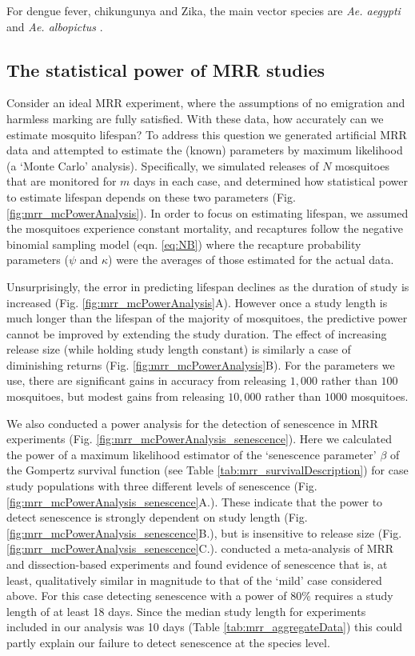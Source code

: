 \documentclass[12pt]{article}
\begin{document}
{For dengue fever, chikungunya and Zika, the main vector species are \textit{Ae. aegypti} and \textit{Ae. albopictus} \citep{kraemer2015global,grard2014zika,benelli2016declining}. 

\subsection{The statistical power of MRR studies}\label{sec:mrr_discussion_MonteCarlo}
Consider an ideal MRR experiment, where the assumptions of no emigration and harmless marking are fully satisfied. With these data, how accurately can we estimate mosquito lifespan? To address this question we generated artificial MRR data and attempted to estimate the (known) parameters by maximum likelihood (a `Monte Carlo' analysis). Specifically, we simulated releases of $N$ mosquitoes that are monitored for $m$ days in each case, and determined how statistical power to estimate lifespan depends on these two parameters (Fig. \ref{fig:mrr_mcPowerAnalysis}). In order to focus on estimating lifespan, we assumed the mosquitoes experience constant mortality, and recaptures follow the negative binomial sampling model (eqn. \ref{eq:NB}) where the recapture probability parameters ($\psi$ and $\kappa$) were the averages of those estimated for the actual data.

Unsurprisingly, the error in predicting lifespan declines as the duration of study is increased (Fig. \ref{fig:mrr_mcPowerAnalysis}A). However once a study length is much longer than the lifespan of the majority of mosquitoes, the predictive power cannot be improved by extending the study duration. The effect of increasing release size (while holding study length constant) is similarly a case of diminishing returns (Fig. \ref{fig:mrr_mcPowerAnalysis}B). For the parameters we use, there are significant gains in accuracy from releasing $1,000$ rather than $100$ mosquitoes, but modest gains from releasing $10,000$ rather than $1000$ mosquitoes.

We also conducted a power analysis for the detection of senescence in MRR experiments (Fig. \ref{fig:mrr_mcPowerAnalysis_senescence}). Here we calculated the power of a maximum likelihood estimator of the `senescence parameter' $\beta$ of the Gompertz survival function (see Table \ref{tab:mrr_survivalDescription}) for case study populations with three different levels of senescence (Fig. \ref{fig:mrr_mcPowerAnalysis_senescence}A.). These indicate that the power to detect senescence is strongly dependent on study length (Fig. \ref{fig:mrr_mcPowerAnalysis_senescence}B.), but is insensitive to release size (Fig. \ref{fig:mrr_mcPowerAnalysis_senescence}C.). \cite{clements1981analysis} conducted a meta-analysis of MRR and dissection-based experiments and found evidence of senescence that is, at least, qualitatively similar in magnitude to that of the `mild' case considered above. For this case detecting senescence with a power of 80\% requires a study length of at least 18 days. Since the median study length for experiments included in our analysis was 10 days (Table \ref{tab:mrr_aggregateData}) this could partly explain our failure to detect senescence at the species level.




}
\end{document}
